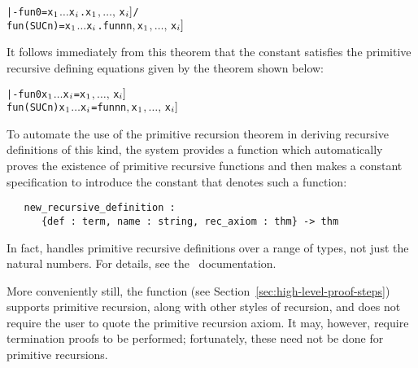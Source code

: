 \begin{hol}
\begin{alltt}
   |- fun 0       = \bs{}x\(\sb{1}\) \(\dots\) x\(\sb{i}\).\m{f\sb{1}[}x\(\sb{1}\)\(,\ldots,\,\)x\(\sb{i}]\) /\bs{}
      fun (SUC n) = \bs{}x\(\sb{1}\) \(\dots\) x\(\sb{i}\).\m{f\sb{2}[}fun n  n\(,\) x\(\sb{1}\)\(,\ldots,\,\)x\(\sb{i}]\)
\end{alltt}
\end{hol}

\noindent It follows immediately from this theorem that the constant 
satisfies the primitive recursive defining equations given by the theorem shown
below:

\begin{hol}
\begin{alltt}
   |- fun 0 x\(\sb{1}\) \(\dots\) x\(\sb{i}\) = \m{f\sb{1}[}x\(\sb{1}\)\(,\ldots,\,\)x\(\sb{i}]\)
      fun (SUC n) x\(\sb{1}\) \(\dots\) x\(\sb{i}\) = \m{f\sb{2}[}fun n  n\(,\) x\(\sb{1}\)\(,\ldots,\,\)x\(\sb{i}]\)
\end{alltt}
\end{hol}

To automate the use of the primitive recursion theorem in deriving
recursive definitions of this kind, the \HOL{} system provides a function
which automatically proves the existence of primitive recursive
functions and then makes a constant specification to introduce the constant
that denotes such a function:

\begin{boxed}
\begin{verbatim}
   new_recursive_definition :
      {def : term, name : string, rec_axiom : thm} -> thm
\end{verbatim}
\end{boxed}

\noindent In fact,  handles
primitive recursive definitions over a range of types, not just the
natural numbers. For details, see the \REFERENCE\ documentation.

More conveniently still, the  function (see
Section~\ref{sec:high-level-proof-steps}) supports primitive
recursion, along with other styles of recursion, and does not require
the user to quote the primitive recursion axiom. It may, however,
require termination proofs to be performed; fortunately, these need
not be done for primitive recursions.

